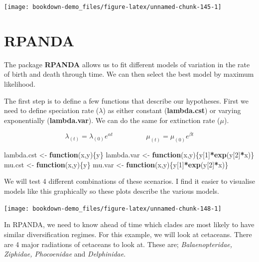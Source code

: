 \documentclass[
]{book}
\newenvironment{Shaded}{\begin{snugshade}}{\end{snugshade}}
\newcommand{\ControlFlowTok}[1]{\textcolor[rgb]{0.13,0.29,0.53}{\textbf{#1}}}
\newcommand{\DecValTok}[1]{\textcolor[rgb]{0.00,0.00,0.81}{#1}}
\newcommand{\KeywordTok}[1]{\textcolor[rgb]{0.13,0.29,0.53}{\textbf{#1}}}
\newcommand{\NormalTok}[1]{#1}
\newcommand{\OperatorTok}[1]{\textcolor[rgb]{0.81,0.36,0.00}{\textbf{#1}}}
\newcommand{\StringTok}[1]{\textcolor[rgb]{0.31,0.60,0.02}{#1}}
\begin{document}
\begin{center}\texttt{[image: bookdown-demo\_files/figure-latex/unnamed-chunk-145-1]} \end{center}

\hypertarget{rpanda}{%
\section{RPANDA}\label{rpanda}}

The package \textbf{RPANDA} \citep{rpanda} allows us to fit different models of variation in the rate of birth and death through time. We can then select the best model by maximum likelihood.

The first step is to define a few functions that describe our hypotheses. First we need to define speciation rate (\(\lambda\)) as either constant (\textbf{lambda.cst}) or varying exponentially (\textbf{lambda.var}). We can do the same for extinction rate (\(\mu\)).

\[ \lambda_{(t)} = \lambda_{(0)}e^{\alpha t} \;\;\;\;\;\;\;\;\;\;\;\;\;\;\;\;\;  \mu_{(t)} = \mu_{(0)}e^{\beta t} \]

\begin{Shaded}
\begin{Highlighting}[]
\NormalTok{lambda.cst \textless{}{-}}\StringTok{ }\ControlFlowTok{function}\NormalTok{(x,y)\{y\}}
\NormalTok{lambda.var \textless{}{-}}\StringTok{ }\ControlFlowTok{function}\NormalTok{(x,y)\{y[}\DecValTok{1}\NormalTok{]}\OperatorTok{*}\KeywordTok{exp}\NormalTok{(y[}\DecValTok{2}\NormalTok{]}\OperatorTok{*}\NormalTok{x)\}}
\NormalTok{mu.cst \textless{}{-}}\StringTok{ }\ControlFlowTok{function}\NormalTok{(x,y)\{y\}}
\NormalTok{mu.var \textless{}{-}}\StringTok{ }\ControlFlowTok{function}\NormalTok{(x,y)\{y[}\DecValTok{1}\NormalTok{]}\OperatorTok{*}\KeywordTok{exp}\NormalTok{(y[}\DecValTok{2}\NormalTok{]}\OperatorTok{*}\NormalTok{x)\}}
\end{Highlighting}
\end{Shaded}

We will test 4 different combinations of these scenarios. I find it easier to visualise models like this graphically so these plots describe the various models.

\begin{center}\texttt{[image: bookdown-demo\_files/figure-latex/unnamed-chunk-148-1]} \end{center}

In RPANDA, we need to know ahead of time which clades are most likely to have similar diversification regimes. For this example, we will look at cetaceans. There are 4 major radiations of cetaceans to look at. These are; \emph{Balaenopteridae, Ziphidae, Phocoenidae} and \emph{Delphinidae}.
\end{document}
